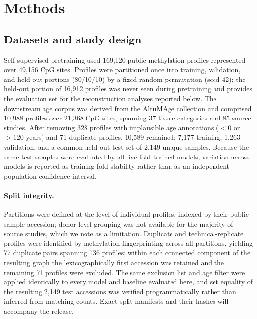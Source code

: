 \section{Methods}

\subsection{Datasets and study design}

Self-supervised pretraining used 169,120 public methylation profiles represented over 49,156
CpG sites. Profiles were partitioned once into training, validation, and held-out portions
(80/10/10) by a fixed random permutation (seed 42); the held-out portion of 16,912 profiles
was never seen during pretraining and provides the evaluation set for the reconstruction
analyses reported below. The downstream age corpus was derived from the AltuMAge collection
\citep{deLimaCamillo2022} and comprised 10,988 profiles over 21,368 CpG sites, spanning 37
tissue categories and 85 source studies. After removing 328 profiles with implausible age
annotations ($<0$ or $>120$ years) and 71 duplicate profiles, 10,589 remained: 7,177 training,
1,263 validation, and a common held-out test set of 2,149 unique samples. Because the same
test samples were evaluated by all five fold-trained models, variation across models is
reported as training-fold stability rather than as an independent population confidence
interval.

\paragraph{Split integrity.}
Partitions were defined at the level of individual profiles, indexed by their public sample
accession; donor-level grouping was not available for the majority of source studies, which we
note as a limitation. Duplicate and technical-replicate profiles were identified by
methylation fingerprinting across all partitions, yielding 77 duplicate pairs spanning 136
profiles; within each connected component of the resulting graph the lexicographically first
accession was retained and the remaining 71 profiles were excluded. The same exclusion list
and age filter were applied identically to every model and baseline evaluated here, and set
equality of the resulting 2,149 test accessions was verified programmatically rather than
inferred from matching counts. Exact split manifests and their hashes will accompany the
release.

